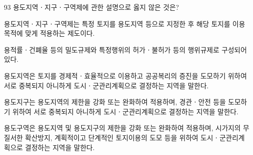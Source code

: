 \begin{question}{93}
용도지역ㆍ지구ㆍ구역제에 관한 설명으로 옳지 않은 것은?
\begin{choices}
  \item 용도지역ㆍ지구ㆍ구역제는 특정 토지를 용도지역 등으로 지정한 후 해당 토지를 이용 목적에 맞게 적용하는 제도이다.
  \item 용적률ㆍ건폐율 등의 밀도규제와 특정행위의 허가ㆍ불허가 등의 행위규제로 구성되어 있다.
  \item 용도지역은 토지를 경제적ㆍ효율적으로 이용하고 공공복리의 증진을 도모하기 위하여 서로 중복되지 아니하게 도시ㆍ군관리계획으로 결정하는 지역을 말한다.
  \item 용도지구는 용도지역의 제한을 강화 또는 완화하여 적용하며, 경관ㆍ안전 등을 도모하기 위하여 서로 중복되지 아니하게 도시ㆍ군관리계획으로 결정하는 지역을 말한다.
  \item 용도구역은 용도지역 및 용도지구의 제한을 강화 또는 완화하여 적용하며, 시가지의 무질서한 확산방지, 계획적이고 단계적인 토지이용의 도모 등을 위하여 도시ㆍ군관리계획으로 결정하는 지역을 말한다.
\end{choices}
\end{question}
